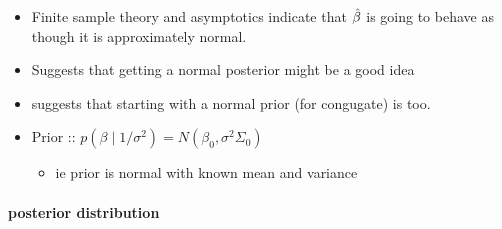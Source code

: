 \begin{itemize}
\item Finite sample theory and asymptotics indicate that
  $\hat{\beta}$ is going to behave as though it is approximately normal.
\item Suggests that getting a normal posterior might be a good idea
\item suggests that starting with a normal prior (for congugate) is too.
\item Prior :: $p(\beta \mid 1/\sigma^2) = N(\beta_0, \sigma^2 \Sigma_0)$
\begin{itemize}
\item ie prior is normal with known mean and variance
\end{itemize}
\end{itemize}

\paragraph{posterior distribution}
